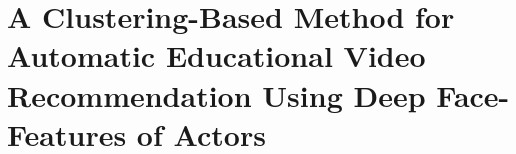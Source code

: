 \newpage
\chapter{A Clustering-Based Method for Automatic Educational Video Recommendation Using Deep Face-Features of Actors}
\label{chap:educational_recommendation}

